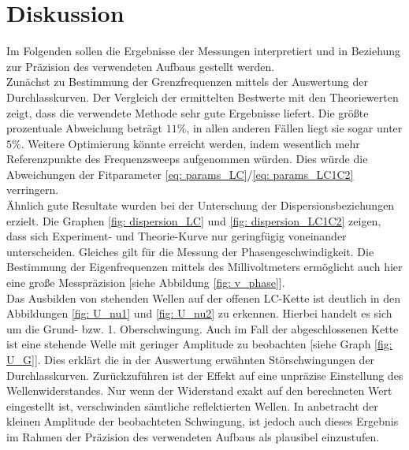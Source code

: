 \section{Diskussion}
Im Folgenden sollen die Ergebnisse der Messungen interpretiert und in Beziehung zur Präzision des verwendeten Aufbaus gestellt werden. \\
Zunächst zu Bestimmung der Grenzfrequenzen mittels der Auswertung der Durchlasskurven. Der Vergleich
der ermittelten Bestwerte mit den Theoriewerten zeigt, dass die verwendete Methode sehr gute Ergebnisse liefert. Die größte
prozentuale Abweichung beträgt $11\%$, in allen anderen Fällen liegt sie sogar unter $5\%$. Weitere Optimierung
könnte erreicht werden, indem wesentlich mehr Referenzpunkte des Frequenzsweeps aufgenommen würden. Dies würde
die Abweichungen der Fitparameter \eqref{eq: params_LC}/\eqref{eq: params_LC1C2} verringern. \\
Ähnlich gute Resultate wurden bei der Unterschung der Dispersionsbeziehungen erzielt. Die Graphen \ref{fig: dispersion_LC} und \ref{fig: dispersion_LC1C2}
zeigen, dass sich Experiment- und Theorie-Kurve nur geringfügig voneinander unterscheiden. Gleiches gilt
für die Messung der Phasengeschwindigkeit. Die Bestimmung der Eigenfrequenzen mittels des Millivoltmeters ermöglicht
auch hier eine große Messpräzision [siehe Abbildung \ref{fig: v_phase}].\\
Das Ausbilden von stehenden Wellen auf der offenen LC-Kette ist deutlich in den Abbildungen \ref{fig: U_nu1} und \ref{fig: U_nu2}
zu erkennen. Hierbei handelt es sich um die Grund- bzw. 1. Oberschwingung. Auch im Fall
der abgeschlossenen Kette ist eine stehende Welle mit geringer Amplitude zu beobachten [siehe Graph \ref{fig: U_G}]. Dies erklärt
die in der Auswertung erwähnten Störschwingungen der Durchlasskurven. Zurückzuführen ist der Effekt auf eine unpräzise
Einstellung des Wellenwiderstandes. Nur wenn der Widerstand exakt auf den berechneten
Wert eingestellt ist, verschwinden sämtliche reflektierten Wellen. In anbetracht der kleinen Amplitude der beobachteten
Schwingung, ist jedoch auch dieses Ergebnis im Rahmen der Präzision des verwendeten Aufbaus als plausibel einzustufen.
